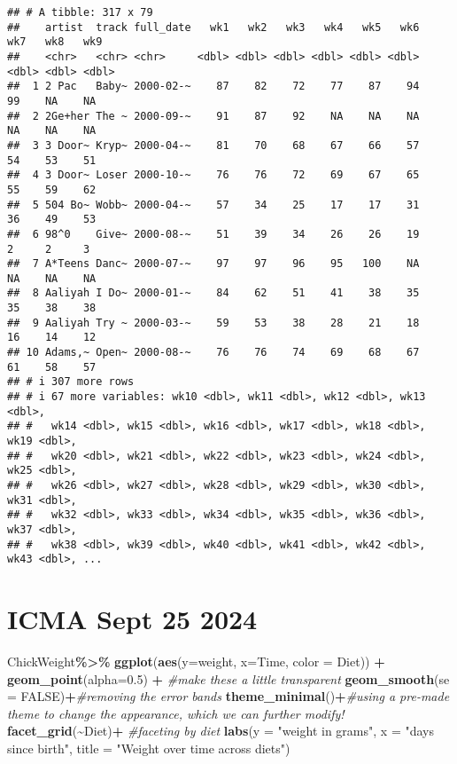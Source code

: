 \documentclass[
]{article}
\newenvironment{Shaded}{\begin{snugshade}}{\end{snugshade}}
\newcommand{\AttributeTok}[1]{\textcolor[rgb]{0.13,0.29,0.53}{#1}}
\newcommand{\CommentTok}[1]{\textcolor[rgb]{0.56,0.35,0.01}{\textit{#1}}}
\newcommand{\ConstantTok}[1]{\textcolor[rgb]{0.56,0.35,0.01}{#1}}
\newcommand{\FloatTok}[1]{\textcolor[rgb]{0.00,0.00,0.81}{#1}}
\newcommand{\FunctionTok}[1]{\textcolor[rgb]{0.13,0.29,0.53}{\textbf{#1}}}
\newcommand{\NormalTok}[1]{#1}
\newcommand{\SpecialCharTok}[1]{\textcolor[rgb]{0.81,0.36,0.00}{\textbf{#1}}}
\newcommand{\StringTok}[1]{\textcolor[rgb]{0.31,0.60,0.02}{#1}}
\begin{document}
\begin{verbatim}
## # A tibble: 317 x 79
##    artist  track full_date   wk1   wk2   wk3   wk4   wk5   wk6   wk7   wk8   wk9
##    <chr>   <chr> <chr>     <dbl> <dbl> <dbl> <dbl> <dbl> <dbl> <dbl> <dbl> <dbl>
##  1 2 Pac   Baby~ 2000-02-~    87    82    72    77    87    94    99    NA    NA
##  2 2Ge+her The ~ 2000-09-~    91    87    92    NA    NA    NA    NA    NA    NA
##  3 3 Door~ Kryp~ 2000-04-~    81    70    68    67    66    57    54    53    51
##  4 3 Door~ Loser 2000-10-~    76    76    72    69    67    65    55    59    62
##  5 504 Bo~ Wobb~ 2000-04-~    57    34    25    17    17    31    36    49    53
##  6 98^0    Give~ 2000-08-~    51    39    34    26    26    19     2     2     3
##  7 A*Teens Danc~ 2000-07-~    97    97    96    95   100    NA    NA    NA    NA
##  8 Aaliyah I Do~ 2000-01-~    84    62    51    41    38    35    35    38    38
##  9 Aaliyah Try ~ 2000-03-~    59    53    38    28    21    18    16    14    12
## 10 Adams,~ Open~ 2000-08-~    76    76    74    69    68    67    61    58    57
## # i 307 more rows
## # i 67 more variables: wk10 <dbl>, wk11 <dbl>, wk12 <dbl>, wk13 <dbl>,
## #   wk14 <dbl>, wk15 <dbl>, wk16 <dbl>, wk17 <dbl>, wk18 <dbl>, wk19 <dbl>,
## #   wk20 <dbl>, wk21 <dbl>, wk22 <dbl>, wk23 <dbl>, wk24 <dbl>, wk25 <dbl>,
## #   wk26 <dbl>, wk27 <dbl>, wk28 <dbl>, wk29 <dbl>, wk30 <dbl>, wk31 <dbl>,
## #   wk32 <dbl>, wk33 <dbl>, wk34 <dbl>, wk35 <dbl>, wk36 <dbl>, wk37 <dbl>,
## #   wk38 <dbl>, wk39 <dbl>, wk40 <dbl>, wk41 <dbl>, wk42 <dbl>, wk43 <dbl>, ...
\end{verbatim}

\section{ICMA Sept 25 2024}\label{icma-sept-25-2024}

\begin{Shaded}
\begin{Highlighting}[]
\NormalTok{ChickWeight}\SpecialCharTok{\%\textgreater{}\%}
  \FunctionTok{ggplot}\NormalTok{(}\FunctionTok{aes}\NormalTok{(}\AttributeTok{y=}\NormalTok{weight,}
             \AttributeTok{x=}\NormalTok{Time,}
             \AttributeTok{color =}\NormalTok{ Diet)) }\SpecialCharTok{+}
  \FunctionTok{geom\_point}\NormalTok{(}\AttributeTok{alpha=}\FloatTok{0.5}\NormalTok{) }\SpecialCharTok{+} \CommentTok{\#make these a little transparent}
  \FunctionTok{geom\_smooth}\NormalTok{(}\AttributeTok{se =} \ConstantTok{FALSE}\NormalTok{)}\SpecialCharTok{+}\CommentTok{\#removing the error bands}
  \FunctionTok{theme\_minimal}\NormalTok{()}\SpecialCharTok{+}\CommentTok{\#using a pre{-}made theme to change the appearance, which we can further modify!}
  \FunctionTok{facet\_grid}\NormalTok{(}\SpecialCharTok{\textasciitilde{}}\NormalTok{Diet)}\SpecialCharTok{+} \CommentTok{\#faceting by diet}
  \FunctionTok{labs}\NormalTok{(}\AttributeTok{y =} \StringTok{"weight in grams"}\NormalTok{,}
       \AttributeTok{x =} \StringTok{"days since birth"}\NormalTok{,}
       \AttributeTok{title =} \StringTok{"Weight over time across diets"}\NormalTok{)}
\end{Highlighting}
\end{Shaded}
\end{document}
